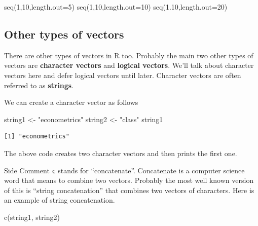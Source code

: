 \documentclass[
  letterpaper,
  DIV=11,
  numbers=noendperiod]{scrreprt}
\newenvironment{Shaded}{\begin{snugshade}}{\end{snugshade}}
\newcommand{\AttributeTok}[1]{\textcolor[rgb]{0.40,0.45,0.13}{#1}}
\newcommand{\DecValTok}[1]{\textcolor[rgb]{0.68,0.00,0.00}{#1}}
\newcommand{\FloatTok}[1]{\textcolor[rgb]{0.68,0.00,0.00}{#1}}
\newcommand{\FunctionTok}[1]{\textcolor[rgb]{0.28,0.35,0.67}{#1}}
\newcommand{\NormalTok}[1]{\textcolor[rgb]{0.00,0.23,0.31}{#1}}
\newcommand{\OtherTok}[1]{\textcolor[rgb]{0.00,0.23,0.31}{#1}}
\newcommand{\StringTok}[1]{\textcolor[rgb]{0.13,0.47,0.30}{#1}}
\begin{document}
\begin{Shaded}
\begin{Highlighting}[]
\FunctionTok{seq}\NormalTok{(}\DecValTok{1}\NormalTok{,}\DecValTok{10}\NormalTok{,}\AttributeTok{length.out=}\DecValTok{5}\NormalTok{)}
\FunctionTok{seq}\NormalTok{(}\DecValTok{1}\NormalTok{,}\DecValTok{10}\NormalTok{,}\AttributeTok{length.out=}\DecValTok{10}\NormalTok{)}
\FunctionTok{seq}\NormalTok{(}\FloatTok{1.10}\NormalTok{,}\AttributeTok{length.out=}\DecValTok{20}\NormalTok{)}
\end{Highlighting}
\end{Shaded}

\subsection{Other types of vectors}\label{other-types-of-vectors}

There are other types of vectors in R too. Probably the main two other
types of vectors are \textbf{character vectors} and \textbf{logical
vectors}. We'll talk about character vectors here and defer logical
vectors until later. Character vectors are often referred to as
\textbf{strings}.

We can create a character vector as follows

\begin{Shaded}
\begin{Highlighting}[]
\NormalTok{string1 }\OtherTok{\textless{}{-}} \StringTok{"econometrics"}
\NormalTok{string2 }\OtherTok{\textless{}{-}} \StringTok{"class"}
\NormalTok{string1}
\end{Highlighting}
\end{Shaded}

\begin{verbatim}
[1] "econometrics"
\end{verbatim}

The above code creates two character vectors and then prints the first
one.

{Side Comment} \texttt{c} stands for ``concatenate''. Concatenate is a
computer science word that means to combine two vectors. Probably the
most well known version of this is ``string concatenation'' that
combines two vectors of characters. Here is an example of string
concatenation.

\begin{Shaded}
\begin{Highlighting}[]
\FunctionTok{c}\NormalTok{(string1, string2)}
\end{Highlighting}
\end{Shaded}
\end{document}
